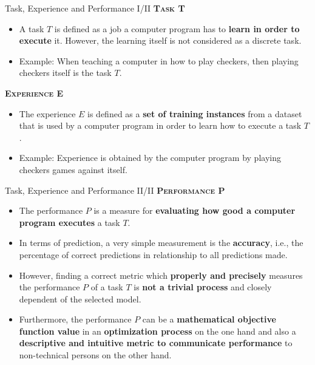 \documentclass[document.tex]{subfiles}
\begin{document}
    \begin{frame}{Task, Experience and Performance I/II}
        \alert{\textsc{\textbf{Task T}}}
        \vspace{-1mm}
        \begin{itemize}
            \item A task $T$ is defined as a job a computer program has to \textbf{learn in order to execute} it. However, the learning itself is not considered as a discrete task.
            \item Example: When teaching a computer in how to play checkers, then playing checkers itself is the task $T$.
        \end{itemize}
        
        \alert{\textsc{\textbf{Experience E}}}
        \vspace{-1mm}
        \begin{itemize}
            \item The experience $E$ is defined as a \textbf{set of training instances} from a dataset that is used by a computer program in order to learn how to execute a task $T$.
            \item Example: Experience is obtained by the computer program by playing checkers games against itself. 
        \end{itemize}
    \end{frame}
    
    \begin{frame}{Task, Experience and Performance II/II}
        \alert{\textsc{\textbf{Performance P}}}
        \vspace{-1mm}
        \begin{itemize}
            \item The performance $P$ is a measure for \textbf{evaluating how good a computer program executes} a task $T$.
            \item In terms of prediction, a very simple measurement is the \textbf{accuracy}, i.e., the percentage of correct predictions in relationship to all predictions made.
            \item However, finding a correct metric which \textbf{properly and precisely} measures the performance $P$  of a task $T$ is \textbf{not a trivial process} and closely dependent of the selected model.
            \item Furthermore, the performance $P$ can be a\textbf{ mathematical objective function value} in an \textbf{optimization process} on the one hand and also a \textbf{descriptive and intuitive metric to communicate performance} to non-technical persons on the other hand.
        \end{itemize}
    \end{frame}
\end{document}
